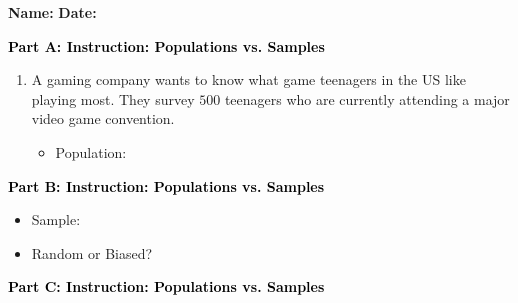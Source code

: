\documentclass[12pt, letterpaper, fleqn]{article}
\newcommand{\blanklong}{\underline{\hspace{6.5cm}}}
\begin{document}
\textbf{Name:} \underline{\hspace{5cm}}
\hfill
\textbf{Date:} \underline{\hspace{3cm}}\\

\begin{tcolorbox}[colback=customteal!20]
\large\textcolor{black}{\textbf{Part A: Instruction: Populations vs. Samples}}
\end{tcolorbox}

\vspace{3mm}

\begin{enumerate}[itemsep=2.2cm, leftmargin=0.6cm]
\item A gaming company wants to know what game teenagers in the US like playing most. They survey $500$ teenagers who are currently attending a major video game convention.
\begin{itemize}
\item Population: \blanklong
\end{itemize}
\end{enumerate}

\newpage

\begin{tcolorbox}[colback=customteal!20]
\large\textcolor{black}{\textbf{Part B: Instruction: Populations vs. Samples}}
\end{tcolorbox}

\vspace{3mm}

\begin{enumerate}[itemsep=2.2cm, leftmargin=0.6cm, resume]
\begin{itemize}
\item Sample: \blanklong
\item Random or Biased? \blanklong
\end{itemize}
\end{enumerate}

\newpage

\begin{tcolorbox}[colback=customteal!20]
\large\textcolor{black}{\textbf{Part C: Instruction: Populations vs. Samples}}
\end{tcolorbox}

\vspace{3mm}
\end{document}
